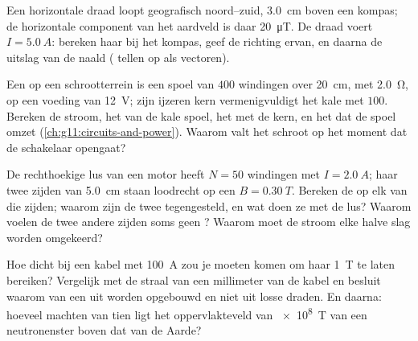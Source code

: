 \begin{exercise}[$\star\star\star$]\label{exo:g11:magnetic-fields:12}
Een horizontale draad loopt geografisch noord--zuid, \qty{3.0}{cm} boven
een kompas; de horizontale component van het aardveld is daar
\qty{20}{\micro T}. De draad voert $I = \qty{5.0}{A}$: bereken haar 
bij het kompas, geef de richting ervan, en daarna de uitslag van de naald
( tellen op als vectoren).
\end{exercise}

\begin{exercise}[$\star\star\star$]\label{exo:g11:magnetic-fields:13}
Een  op een schrootterrein is een spoel van $400$
windingen over \qty{20}{cm}, met  \qty{2.0}{\ohm}, op een
voeding van \qty{12}{V}; zijn ijzeren kern vermenigvuldigt het kale 
met $100$. Bereken de stroom, het  van de kale spoel, het  met de
kern, en het  dat de spoel omzet
(\cref{ch:g11:circuits-and-power}). Waarom valt het schroot op het moment
dat de schakelaar opengaat?
\end{exercise}

\begin{exercise}[$\star\star\star$]\label{exo:g11:magnetic-fields:14}
De rechthoekige lus van een motor heeft $N = 50$ windingen met
$I = \qty{2.0}{A}$; haar twee zijden van \qty{5.0}{cm} staan loodrecht op
een  $B = \qty{0.30}{T}$. Bereken de  op elk van die zijden;
waarom zijn de twee  tegengesteld, en wat doen ze met de lus?
Waarom voelen de twee andere zijden soms geen ? Waarom moet de
stroom elke halve slag worden omgekeerd?
\end{exercise}

\begin{exercise}[$\star\star\star$]\label{exo:g11:magnetic-fields:15}
Hoe dicht bij een kabel met \qty{100}{A} zou je moeten komen om haar 
\qty{1}{T} te laten bereiken? Vergelijk met de straal van een millimeter
van de kabel en besluit waarom  van een  uit  worden
opgebouwd en niet uit losse draden. En daarna: hoeveel machten van tien
ligt het oppervlakteveld van \qty{e8}{T} van een neutronenster boven dat
van de Aarde?
\end{exercise}

